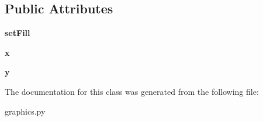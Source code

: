 \subsection*{Public Attributes}
\begin{DoxyCompactItemize}
\item 
{\bfseries set\+Fill}\hypertarget{classgraphics_1_1_point_a407fd24b47309128a86e144baa128c09}{}\label{classgraphics_1_1_point_a407fd24b47309128a86e144baa128c09}

\item 
{\bfseries x}\hypertarget{classgraphics_1_1_point_a1ecd4579c57a7a0032a630a96bbe173c}{}\label{classgraphics_1_1_point_a1ecd4579c57a7a0032a630a96bbe173c}

\item 
{\bfseries y}\hypertarget{classgraphics_1_1_point_a30f1ec4104ee8cb436049ee7aceb8cf4}{}\label{classgraphics_1_1_point_a30f1ec4104ee8cb436049ee7aceb8cf4}

\end{DoxyCompactItemize}


The documentation for this class was generated from the following file\+:\begin{DoxyCompactItemize}
\item 
graphics.\+py\end{DoxyCompactItemize}

